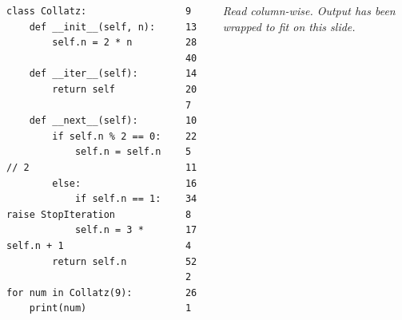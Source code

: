 
\begin{frame}[fragile]
%
\begin{columns}[T]
\begin{codebox}
\begin{verbatim}
class Collatz:
    def __init__(self, n):
        self.n = 2 * n

    def __iter__(self):
        return self

    def __next__(self):
        if self.n % 2 == 0:
            self.n = self.n // 2
        else:
            if self.n == 1: raise StopIteration
            self.n = 3 * self.n + 1
        return self.n

for num in Collatz(9):
    print(num)
\end{verbatim}
\end{codebox}
%
\begin{cmdbox}[Output]
\begin{verbatim}
9   13
28  40
14  20
7   10
22  5
11  16
34  8
17  4
52  2
26  1
\end{verbatim}
\end{cmdbox}
%
\footnotesize
\emph{Read column-wise. Output has been wrapped to fit on this slide.}
\end{columns}
%
\end{frame}


